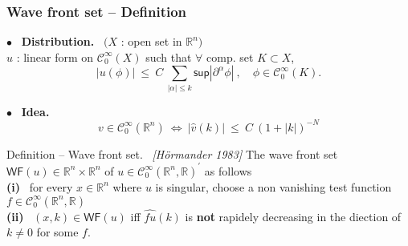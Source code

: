 \documentclass[9pt]{beamer}
\newcommand{\abs}[1]{\left|{#1}\right|} %
\renewcommand{\sup}{\mathsf{sup}} %
\newcommand{\WF}{\mathsf{WF}} %
\newcommand{\citebeam}[1]{\textit{\textcolor{black!60!white}{[#1]}}} %
\newcommand{\Ccal}{\mathcal{C}}
\newcommand{\Rbb}{\mathbb{R}}
\begin{document}
\begin{frame}

\frametitle{Wave front set -- Definition}

\vfill

$\bullet$ \ \textbf{Distribution.} \ $\big( X$ : open set in $\Rbb^n \big)$ \\
$u$ : linear form on $\Ccal^\infty_0(X)$ such that $\forall$ comp. set $K \subset X$,
\vspace*{-6pt}
\begin{equation*}
\abs{u(\phi)} \ \leq \ C \ \sum_{\abs{\alpha} \leq k} \sup\abs{\partial^\alpha \phi}   \ , \quad \phi \in \Ccal^\infty_0(K) .
\end{equation*}

\vfill

$\bullet$ \ \textbf{Idea.} 
\vspace*{-6pt}
\begin{equation*}
v \in \Ccal^\infty_0(\Rbb^n) \ \Leftrightarrow \ \abs{\hat{v}(k)} \ \leq \ C \ \left( 1 + \abs{k} \right)^{-N} 
\end{equation*}

\vfill

\begin{block}{Definition -- Wave front set. \ \citebeam{Hörmander 1983}}
 The wave front set $\WF(u) \in \Rbb^n \times \Rbb^n$ of $u \in \Ccal^\infty_0(\Rbb^n, \Rbb)^\prime$ as follows \\[2pt]
\qquad \textbf{(i)} \ for every $x \in \Rbb^n$ where $u$ is singular, choose a non vanishing test function $f \in \Ccal^\infty_0(\Rbb^n, \Rbb)$ \\[2pt]
\qquad \textbf{(ii)} \ $(x,k) \in \WF(u)$ iff $\hat{fu}(k)$ is \textbf{not} rapidely decreasing in the diection of $k \neq 0$ for some $f$.
\end{block}

\vfill

\end{frame}
\end{document}
